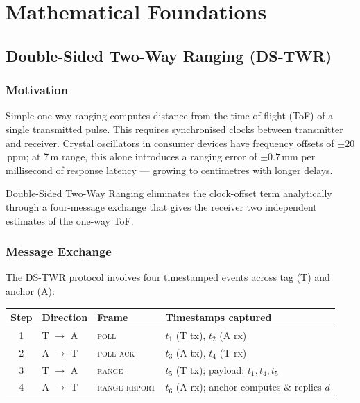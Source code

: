 \documentclass[11pt,a4paper]{article}
\begin{document}
\section{Mathematical Foundations}

\subsection{Double-Sided Two-Way Ranging (DS-TWR)}

\subsubsection{Motivation}

Simple one-way ranging computes distance from the time of flight (ToF) of a single transmitted pulse. This requires synchronised clocks between transmitter and receiver. Crystal oscillators in consumer devices have frequency offsets of $\pm20$\,ppm; at 7\,m range, this alone introduces a ranging error of $\pm 0.7$\,mm per millisecond of response latency — growing to centimetres with longer delays.

Double-Sided Two-Way Ranging eliminates the clock-offset term analytically through a four-message exchange that gives the receiver two independent estimates of the one-way ToF.

\subsubsection{Message Exchange}

The DS-TWR protocol involves four timestamped events across tag (T) and anchor (A):

\begin{center}
\begin{tabular}{clll}
\toprule
\textbf{Step} & \textbf{Direction} & \textbf{Frame} & \textbf{Timestamps captured} \\
\midrule
1 & T $\to$ A & \textsc{poll}      & $t_1$ (T tx), $t_2$ (A rx) \\
2 & A $\to$ T & \textsc{poll-ack}  & $t_3$ (A tx), $t_4$ (T rx) \\
3 & T $\to$ A & \textsc{range}     & $t_5$ (T tx); payload: $t_1,t_4,t_5$ \\
4 & A $\to$ T & \textsc{range-report} & $t_6$ (A rx); anchor computes \& replies $d$ \\
\bottomrule
\end{tabular}
\end{center}
\end{document}
